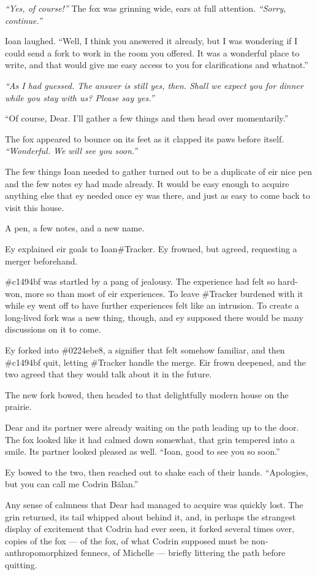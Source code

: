 \emph{``Yes, of course!''} The fox was grinning wide, ears at full attention. \emph{``Sorry, continue.''}

Ioan laughed. ``Well, I think you answered it already, but I was wondering if I could send a fork to work in the room you offered. It was a wonderful place to write, and that would give me easy access to you for clarifications and whatnot.''

\emph{``As I had guessed. The answer is still yes, then. Shall we expect you for dinner while you stay with us? Please say yes.''}

``Of course, Dear. I'll gather a few things and then head over momentarily.''

The fox appeared to bounce on its feet as it clapped its paws before itself. \emph{``Wonderful. We will see you soon.''}

The few things Ioan needed to gather turned out to be a duplicate of eir nice pen and the few notes ey had made already. It would be easy enough to acquire anything else that ey needed once ey was there, and just as easy to come back to visit this house.

A pen, a few notes, and a new name.

Ey explained eir goals to Ioan\#Tracker. Ey frowned, but agreed, requesting a merger beforehand.

\#c1494bf was startled by a pang of jealousy. The experience had felt so hard-won, more so than most of eir experiences. To leave \#Tracker burdened with it while ey went off to have further experiences felt like an intrusion. To create a long-lived fork was a new thing, though, and ey supposed there would be many discussions on it to come.

Ey forked into \#0224ebe8, a signifier that felt somehow familiar, and then \#c1494bf quit, letting \#Tracker handle the merge. Eir frown deepened, and the two agreed that they would talk about it in the future.

The new fork bowed, then headed to that delightfully modern house on the prairie.

Dear and its partner were already waiting on the path leading up to the door. The fox looked like it had calmed down somewhat, that grin tempered into a smile. Its partner looked pleased as well. ``Ioan, good to see you so soon.''

Ey bowed to the two, then reached out to shake each of their hands. ``Apologies, but you can call me Codrin Bălan.''

Any sense of calmness that Dear had managed to acquire was quickly lost. The grin returned, its tail whipped about behind it, and, in perhaps the strangest display of excitement that Codrin had ever seen, it forked several times over, copies of the fox — of the fox, of what Codrin supposed must be non-anthropomorphized fennecs, of Michelle — briefly littering the path before quitting.

